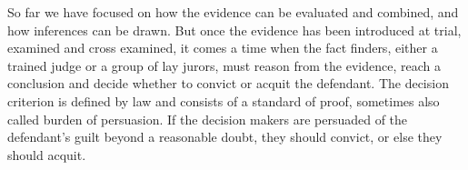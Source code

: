 \documentclass[10pt]{article}
\begin{document}
So far we have focused on how the evidence can be evaluated and combined, and how inferences can be drawn. 
But once the evidence has been introduced at trial, examined and cross examined, it comes a time when the fact finders, either a 
trained judge or a group of lay jurors, must reason from the evidence, reach a conclusion and decide 
whether to convict or acquit the defendant. 
%
The decision criterion is defined by law 
and consists of a standard of proof, sometimes also called burden of persuasion. 
 If the decision makers are persuaded of the defendant's guilt beyond a reasonable doubt, 
 they should convict, or else they should acquit. 
\end{document}
